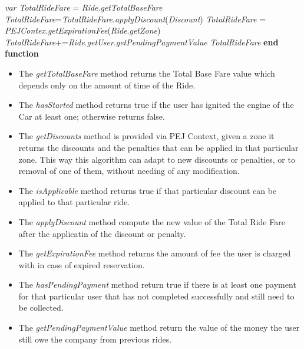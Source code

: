 \begin{algorithm}
\caption{}\label{euclid}
\begin{algorithmic}[1]
\State \textit{var TotalRideFare} = \textit{Ride}.\textit{getTotalBaseFare}
\State \textit{TotalRideFare}=\textit{TotalRideFare}.\textit{applyDiscount}(\textit{Discount})
\EndIf
\EndFor
\Else
\State \textit{TotalRideFare} = \textit{PEJContex}.\textit{getExpirationFee}(\textit{Ride}.\textit{getZone})
\EndIf
{}
\State \textit{TotalRideFare}+=\textit{Ride}.\textit{getUser}.\textit{getPendingPaymentValue}
\EndIf
\State \Return \textit{TotalRideFare}
\EndFunction
\State \textbf{end function}
\end{algorithmic}
\end{algorithm}

\begin{itemize}
    \item The \textit{getTotalBaseFare} method returns the Total Base Fare value which depends only on the amount of time of the Ride.
    \item The \textit{hasStarted} method returns true if the user has ignited the engine of the Car at least one; otherwise returns false.
    \item The \textit{getDiscounts} method is provided via PEJ Context, given a zone it returns the discounts and the penalties that can be applied in that particular zone.\newline
    This way this algorithm can adapt to new discounts or penalties, or to removal of one of them, without needing of any modification.
    \item The \textit{isApplicable} method returns true if that particular discount can be applied to that particular ride.
    \item The \textit{applyDiscount} method compute the new value of the Total Ride Fare after the applicatin of the discount or penalty.
    \item The \textit{getExpirationFee} method returns the amount of fee the user is charged with in case of expired reservation.
    \item The \textit{hasPendingPayment} method return true if there is at least one payment for that particular user that has not completed successfully and still need to be collected.
     \item The \textit{getPendingPaymentValue} method return the value of the money the user still owe the company from previous rides.
\end{itemize}